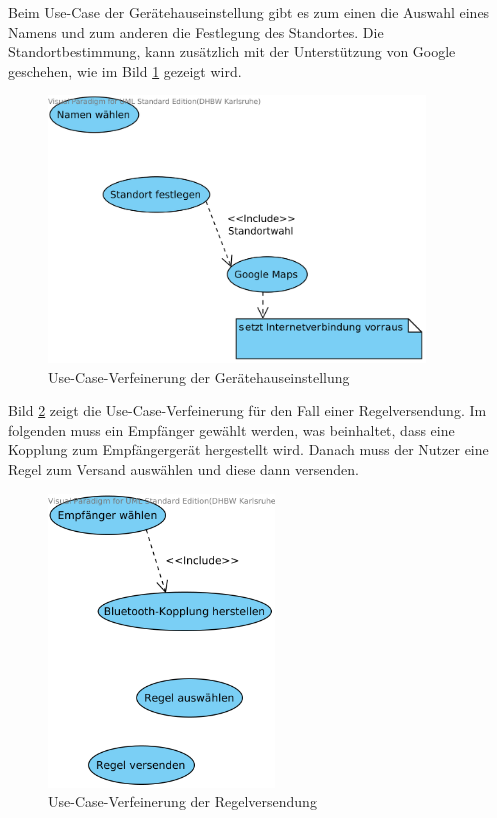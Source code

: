 Beim Use-Case der Ger\"atehauseinstellung gibt es zum einen die Auswahl eines Namens und zum anderen die Festlegung des Standortes. Die Standortbestimmung, kann zus\"atzlich mit der Unterst\"utzung von Google geschehen, wie im Bild \ref{Geraetehauseinstellung Use Case} gezeigt wird.
\begin{figure}[!ht]
\centering
\includegraphics[width=10cm]{Bilder/UseCaseGeraetehauseinstellung.png}
\caption{Use-Case-Verfeinerung der Ger\"atehauseinstellung}
\label{Geraetehauseinstellung Use Case}
\centering
\end{figure}

\newpage

Bild \ref{Regelversendung Use Case} zeigt die Use-Case-Verfeinerung f\"ur den Fall einer Regelversendung. Im folgenden muss ein Empf\"anger gew\"ahlt werden, was beinhaltet, dass eine Kopplung zum Empf\"angerger\"at hergestellt wird. Danach muss der Nutzer eine Regel zum Versand ausw\"ahlen und diese dann versenden. 
\begin{figure}[!ht]
\centering
\includegraphics[width=6cm]{Bilder/UseCaseRegelVersenden.png}
\caption{Use-Case-Verfeinerung der Regelversendung}
\label{Regelversendung Use Case}
\centering
\end{figure}

